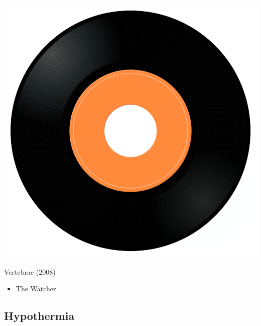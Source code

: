 \begin{minipage}[t]{0.25\textwidth}\vspace{0pt}
\captionsetup{type=figure}
\includegraphics[width=\textwidth]{Images/cover.png}
\caption*{Vertebrae (2008)}
\end{minipage}
\begin{minipage}[t]{0.25\textwidth}\vspace{0pt}
\begin{itemize}[nosep,leftmargin=1em,labelwidth=*,align=left]
	\setlength{\itemsep}{0pt}
	\item The Watcher
\end{itemize}
\end{minipage}

\subsection{Hypothermia}

